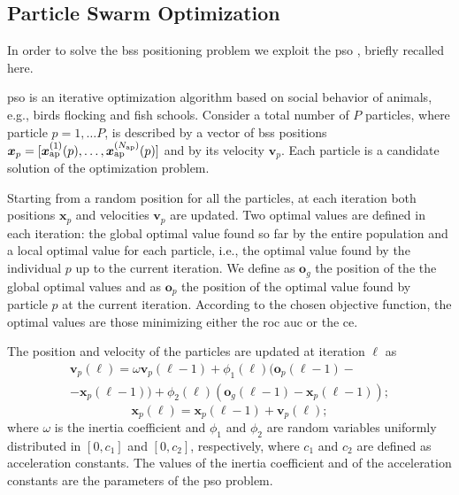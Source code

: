 \documentclass[conference]{IEEEtran}
\begin{document}
\subsection{Particle Swarm Optimization}

In order to solve the \acp{bs} positioning problem we exploit the \ac{pso} \cite{Kennedy-11}, briefly recalled here.
 
\ac{pso} is an iterative optimization algorithm based on social behavior of animals, e.g., birds flocking and fish schools. Consider a total number of $P$ particles, where  particle $p=1, \ldots P$, is described by a vector of \acp{bs} positions $\bm{x}_p = [\bm{x}_{\rm ap}^{(1)}(p),\ldots, \bm{x}_{\rm ap}^{(N_{\rm ap})}(p)]$ and by its velocity $\bm{v}_p$.  Each particle is a candidate solution of the optimization problem. 

Starting from a random position for all the particles, at each iteration both  positions $\bm{x}_p$ and  velocities $\bm{v}_p$ are updated. Two optimal values are defined in each iteration: the global optimal value found so far by the entire population and a local optimal value for each particle, i.e., the optimal value found by the individual $p$ up to the current iteration. We define as $\bm{o}_g$ the position of the the global optimal values and as $\bm{o}_p$ the position of the optimal value found by particle $p$ at the current iteration. According to the chosen objective function, the optimal values are those minimizing either the \ac{roc} \ac{auc} or  the \ac{ce}.

The position and velocity of the particles are updated at iteration $\ell$ as \cite{Kennedy-11}
   \begin{equation}\label{eq: v up}
\begin{split}
  \bm{v}_p(\ell) = \omega \bm{v}_p(\ell-1)+\phi_1(\ell)(\bm{o}_p(\ell-1)-\\
  -\bm{x}_p(\ell-1))+\phi_2(\ell)(\bm{o}_g(\ell-1)-\bm{x}_p(\ell-1));
  \end{split}
  \end{equation}
  \begin{equation}\label{eq: p up}
  \bm{x}_p(\ell) = \bm{x}_p(\ell-1) + \bm{v}_p(\ell);
 \end{equation}
where $\omega$ is the inertia coefficient and $\phi_1$ and $\phi_2$ are random variables uniformly distributed in $[0,c_1]$ and $[0,c_2]$, respectively, where $c_1$ and $c_2$ are defined as acceleration constants. The values of the inertia coefficient and of the acceleration constants are the parameters of the \ac{pso} problem.
\end{document}
